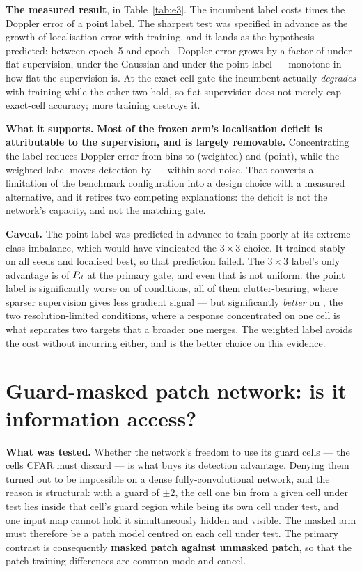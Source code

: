 \textbf{The measured result}, in Table~\ref{tab:e3}. The incumbent label costs
\EthreeFlatDvRatio{} times the Doppler error of a point label. The sharpest test was specified in advance as the growth of localisation error with
training, and it lands as the hypothesis predicted: between epoch~5 and epoch~\TinyEpochs{} Doppler
error grows by a factor of \EthreeFlatGrowth{} under flat supervision, \EthreeGaussGrowth{} under
the Gaussian and \EthreePointGrowth{} under the point label --- monotone in how flat the supervision
is. At the exact-cell gate the incumbent actually \emph{degrades} with training while the other two
hold, so flat supervision does not merely cap exact-cell accuracy; more training destroys it.

\textbf{What it supports.} \textbf{Most of the frozen arm's localisation deficit is attributable to
the supervision, and is largely removable.} Concentrating the label reduces Doppler error from
\EthreeFlatDv{} bins to \EthreeGaussDv{} (weighted) and \EthreePointDv{} (point), while the weighted
label moves detection by \EthreeGaussDeltaPd{} --- within seed noise. That converts a limitation of
the benchmark configuration into a design choice with a measured alternative, and it retires two
competing explanations: the deficit is not the network's capacity, and not the matching gate.

\textbf{Caveat.} The point label was predicted in advance to train poorly at its extreme class
imbalance, which would have vindicated the $3\times3$ choice. It trained stably on all
\TinySeeds{} seeds and localised best, so that prediction failed. The $3\times3$ label's only
advantage is \EthreePointPdGap{} of $P_{d}$ at the primary gate, and even that is not uniform: the
point label is significantly worse on \EthreePointWorseConds{} of \EthreeConds{} conditions, all of
them clutter-bearing, where sparser supervision gives less gradient signal --- but significantly
\emph{better} on \EthreePointBetterConds{}, the two resolution-limited conditions, where a response
concentrated on one cell is what separates two targets that a broader one merges. The weighted label
avoids the cost without incurring either, and is the better choice on this evidence.

\section{Guard-masked patch network: is it information access?}

\textbf{What was tested.} Whether the network's freedom to use its guard cells --- the cells CFAR
must discard --- is what buys its detection advantage. Denying them turned out to be impossible on a
dense fully-convolutional network, and the reason is structural: with a guard of $\pm2$, the cell
one bin from a given cell under test lies inside that cell's guard region while being its own cell
under test, and one input map cannot hold it simultaneously hidden and visible. The masked arm must
therefore be a patch model centred on each cell under test. The primary contrast is consequently
\textbf{masked patch against unmasked patch}, so that the patch-training differences are common-mode
and cancel.

